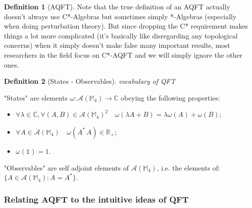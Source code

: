 \documentclass[a4paper,11pt]{article}
\numberwithin{equation}{section}
\theoremstyle{definition}
\newtheorem{definition}{Definition}
\newtheorem{comment}{Comment}
\begin{document}
\begin{definition}[AQFT]
Note that the true definition of an AQFT actually doesn't always use C*-Algebras but sometimes simply *-Algebras (especially when doing perturbation theory). But since dropping the C* requirement makes things a lot more complicated (it's basically like disregarding any topological concerns) when it simply doesn't make false many important results, most researchers in the field focus on C*-AQFT and we will simply ignore the other ones.
\end{definition}

\begin{definition}[States - Observables] \emph{vocabulary of QFT}

"States" are elements $\omega: \mathcal{A}(\mathbb{M}_4)\to\mathbb{C}$ obeying the following properties:
\begin{itemize}
    \item $\forall \lambda\in\mathbb{C}, \forall(A,B)\in\mathcal{A}(\mathbb{M}_4)^2\quad \omega(\lambda A+B)=\lambda \omega(A)+\omega(B)$;
    \item $\forall A \in \mathcal{A}(\mathbb{M}_4)\quad \omega(A^*\, A)\in \mathbb{R}_+$;
    \item $\omega(\mathds{1})=1$.
\end{itemize}
"Observables" are self adjoint elements of $\mathcal{A}(\mathbb{M}_4)$, i.e. the elements of: $\{A \in\mathcal{A}(\mathbb{M}_4):A=A^*\}$.
\end{definition}

\subsubsection{Relating AQFT to the intuitive ideas of QFT}

\end{document}

